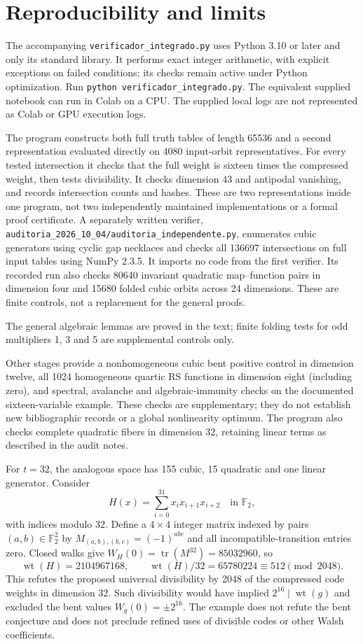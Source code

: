 \documentclass[11pt,a4paper]{article}
\newcommand{\F}{\mathbb F_2}
\newcommand{\wt}{\operatorname{wt}}
\begin{document}
\section{Reproducibility and limits}
The accompanying \texttt{verificador\_integrado.py} uses Python 3.10 or
later and only its standard library. It performs exact integer arithmetic,
with explicit exceptions on failed conditions; its checks remain active
under Python optimization. Run \texttt{python verificador\_integrado.py}.
The equivalent supplied notebook can run in Colab on a CPU. The supplied
local logs are not represented as Colab or GPU execution logs.

The program constructs both full truth tables of length 65536 and a second
representation evaluated directly on 4080 input-orbit representatives.
For every tested intersection it checks that the full weight is sixteen
times the compressed weight, then tests divisibility. It checks dimension
43 and antipodal vanishing, and records intersection counts and hashes.
These are two representations inside one program, not two independently
maintained implementations or a formal proof certificate.
A separately written verifier, \texttt{auditoria\_2026\_10\_04/auditoria\_independente.py}, enumerates cubic generators using cyclic gap necklaces and checks all 136697 intersections on full input tables using NumPy 2.3.5. It imports no code from the first verifier. Its recorded run also checks 80640 invariant quadratic map--function pairs in dimension four and 15680 folded cubic orbits across 24 dimensions. These are finite controls, not a replacement for the general proofs.\par
The general algebraic lemmas are proved in the text; finite folding
tests for odd multipliers 1, 3 and 5 are supplemental controls only.

Other stages provide a nonhomogeneous cubic bent positive control in
dimension twelve, all 1024 homogeneous quartic RS functions in dimension
eight (including zero), and spectral, avalanche and algebraic-immunity
checks on the documented sixteen-variable example. These checks are
supplementary; they do not establish new bibliographic records or a global
nonlinearity optimum. The program also checks complete quadratic fibers
in dimension 32, retaining linear terms as described in the audit notes.

For $t=32$, the analogous space has 155 cubic, 15 quadratic and one linear generator. Consider
\[H(x)=\sum_{i=0}^{31}x_i x_{i+1}x_{i+2}\quad\text{in }\F,\]
with indices modulo 32. Define a $4\times4$ integer matrix indexed by pairs $(a,b)\in\F^2$ by $M_{(a,b),(b,c)}=(-1)^{abc}$ and all incompatible-transition entries zero. Closed walks give $W_H(0)=\operatorname{tr}(M^{32})=85032960$, so
\[\wt(H)=2104967168,\qquad \wt(H)/32=65780224\equiv512\pmod{2048}.\]
This refutes the proposed universal divisibility by 2048 of the compressed code weights in dimension 32. Such divisibility would have implied $2^{16}\mid\wt(g)$ and excluded the bent values $W_g(0)=\pm2^{16}$. The example does not refute the bent conjecture and does not preclude refined uses of divisible codes or other Walsh coefficients.
\end{document}
